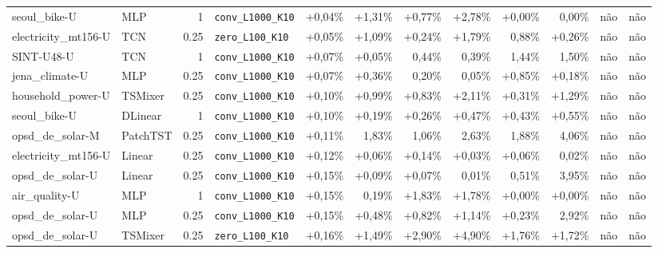 \begin{longtable}{llrlrrrrrrll}
seoul\_bike-U & MLP & 1 & \texttt{conv\_\allowbreak{}L1000\_\allowbreak{}K10} & +0,04\% & +1,31\% & +0,77\% & +2,78\% & +0,00\% & \textminus{}0,00\% & n\~ao & n\~ao \\
electricity\_mt156-U & TCN & 0.25 & \texttt{zero\_\allowbreak{}L100\_\allowbreak{}K10} & +0,05\% & +1,09\% & +0,24\% & +1,79\% & \textminus{}0,88\% & +0,26\% & n\~ao & n\~ao \\
SINT-U48-U & TCN & 1 & \texttt{conv\_\allowbreak{}L1000\_\allowbreak{}K10} & +0,07\% & +0,05\% & \textminus{}0,44\% & \textminus{}0,39\% & \textminus{}1,44\% & \textminus{}1,50\% & n\~ao & n\~ao \\
jena\_climate-U & MLP & 0.25 & \texttt{conv\_\allowbreak{}L1000\_\allowbreak{}K10} & +0,07\% & +0,36\% & \textminus{}0,20\% & \textminus{}0,05\% & +0,85\% & +0,18\% & n\~ao & n\~ao \\
household\_power-U & TSMixer & 0.25 & \texttt{conv\_\allowbreak{}L1000\_\allowbreak{}K10} & +0,10\% & +0,99\% & +0,83\% & +2,11\% & +0,31\% & +1,29\% & n\~ao & n\~ao \\
seoul\_bike-U & DLinear & 1 & \texttt{conv\_\allowbreak{}L1000\_\allowbreak{}K10} & +0,10\% & +0,19\% & +0,26\% & +0,47\% & +0,43\% & +0,55\% & n\~ao & n\~ao \\
opsd\_de\_solar-M & PatchTST & 0.25 & \texttt{conv\_\allowbreak{}L1000\_\allowbreak{}K10} & +0,11\% & \textminus{}1,83\% & \textminus{}1,06\% & \textminus{}2,63\% & \textminus{}1,88\% & \textminus{}4,06\% & n\~ao & n\~ao \\
electricity\_mt156-U & Linear & 0.25 & \texttt{conv\_\allowbreak{}L1000\_\allowbreak{}K10} & +0,12\% & +0,06\% & +0,14\% & +0,03\% & +0,06\% & \textminus{}0,02\% & n\~ao & n\~ao \\
opsd\_de\_solar-U & Linear & 0.25 & \texttt{conv\_\allowbreak{}L1000\_\allowbreak{}K10} & +0,15\% & +0,09\% & +0,07\% & \textminus{}0,01\% & \textminus{}0,51\% & \textminus{}3,95\% & n\~ao & n\~ao \\
air\_quality-U & MLP & 1 & \texttt{conv\_\allowbreak{}L1000\_\allowbreak{}K10} & +0,15\% & \textminus{}0,19\% & +1,83\% & +1,78\% & +0,00\% & +0,00\% & n\~ao & n\~ao \\
opsd\_de\_solar-U & MLP & 0.25 & \texttt{conv\_\allowbreak{}L1000\_\allowbreak{}K10} & +0,15\% & +0,48\% & +0,82\% & +1,14\% & +0,23\% & \textminus{}2,92\% & n\~ao & n\~ao \\
opsd\_de\_solar-U & TSMixer & 0.25 & \texttt{zero\_\allowbreak{}L100\_\allowbreak{}K10} & +0,16\% & +1,49\% & +2,90\% & +4,90\% & +1,76\% & +1,72\% & n\~ao & n\~ao \\

\end{longtable}
